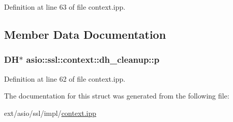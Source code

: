 Definition at line 63 of file context.\+ipp.



\subsection{Member Data Documentation}
\hypertarget{structasio_1_1ssl_1_1context_1_1dh__cleanup_a4e744aae458fbf22178ee9d45777bd11}{}
\subsubsection[{p}]{\setlength{\rightskip}{0pt plus 5cm}D\+H$\ast$ asio\+::ssl\+::context\+::dh\+\_\+cleanup\+::p}\label{structasio_1_1ssl_1_1context_1_1dh__cleanup_a4e744aae458fbf22178ee9d45777bd11}


Definition at line 62 of file context.\+ipp.



The documentation for this struct was generated from the following file\+:\begin{DoxyCompactItemize}
\item 
ext/asio/ssl/impl/\hyperlink{context_8ipp}{context.\+ipp}\end{DoxyCompactItemize}
